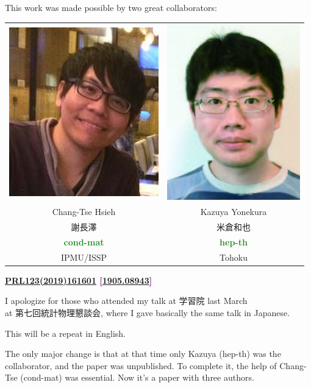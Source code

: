 \documentclass[xcolor={svgnames,rgb}]{beamer}
\def\bff{\ifmmode\else\bfseries\fi}
\def\green#1{\textcolor{ForestGreen}{\bff #1}}
\def\purple#1{\textcolor{Purple}{\bff #1}}
\let\oldhref\href
\def\arxiv#1{\oldhref{http://arxiv.org/abs/#1}{#1}}
\begin{document}
\begin{frame}

\begin{center}
This work was made possible by two great collaborators:

\begin{tabular}{c@{\qquad\qquad}c}
\includegraphics[height=.4\textheight]{chang-tse.jpg} & 
\includegraphics[height=.4\textheight]{kazuya.jpg} \\
Chang-Tse Hsieh & Kazuya Yonekura \\
謝長澤 & 米倉和也 \\ 
\green{cond-mat} & \green{hep-th} \\
IPMU/ISSP & Tohoku
\end{tabular}

\purple{\href{https://dx.doi.org/10.1103/PhysRevLett.123.161601}{PRL123(2019)161601} [\arxiv{1905.08943}] }

\end{center}

\end{frame}

\begin{frame}

I apologize for those who attended my talk at 学習院 last March \\
at 第七回統計物理懇談会, where I gave basically the same talk in Japanese. 

This will be a repeat in English.

The only major change is that at that time only Kazuya (hep-th) was the collaborator, and the paper was unpublished.
To complete it, the help of Chang-Tse (cond-mat) was essential. Now it's a paper with three authors.


\end{frame}
\end{document}
